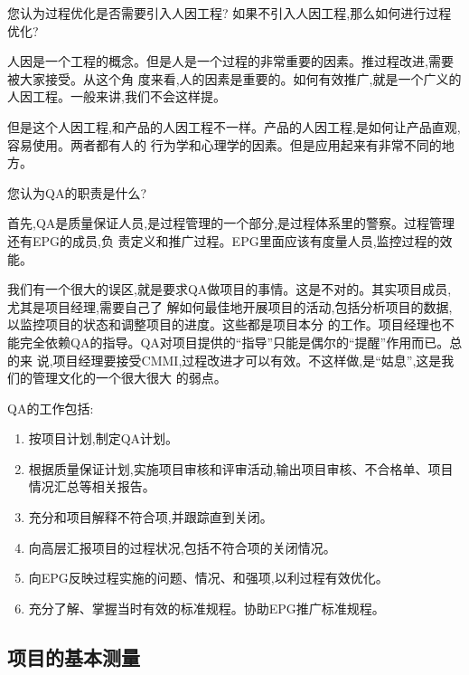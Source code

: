\documentclass[11pt]{article}
\begin{document}
\qlogo \begin{staff}
您认为过程优化是否需要引入人因工程? 如果不引入人因工程,那么如何进行过程优化?
\end{staff}

\begin{yang}
  \ylogo 人因是一个工程的概念。但是人是一个过程的非常重要的因素。推过程改进,需要被大家接受。从这个角
  度来看,人的因素是重要的。如何有效推广,就是一个广义的人因工程。一般来讲,我们不会这样提。

  但是这个人因工程,和产品的人因工程不一样。产品的人因工程,是如何让产品直观,容易使用。两者都有人的
  行为学和心理学的因素。但是应用起来有非常不同的地方。
\end{yang}

\qlogo\begin{staff}
您认为QA的职责是什么?
\end{staff}

\begin{yang}
  \ylogo 首先,QA是质量保证人员,是过程管理的一个部分,是过程体系里的警察。过程管理还有EPG的成员,负
  责定义和推广过程。EPG里面应该有度量人员,监控过程的效能。

  我们有一个很大的误区,就是要求QA做项目的事情。这是不对的。其实项目成员,尤其是项目经理,需要自己了
  解如何最佳地开展项目的活动,包括分析项目的数据,以监控项目的状态和调整项目的进度。这些都是项目本分
  的工作。项目经理也不能完全依赖QA的指导。QA对项目提供的``指导''只能是偶尔的``提醒''作用而已。总的来
  说,项目经理要接受CMMI,过程改进才可以有效。不这样做,是``姑息'',这是我们的管理文化的一个很大很大
  的弱点。

  QA的工作包括:
  \begin{enumerate}
    \item 按项目计划,制定QA计划。
    \item 根据质量保证计划,实施项目审核和评审活动,输出项目审核、不合格单、项目情况汇总等相关报告。
    \item 充分和项目解释不符合项,并跟踪直到关闭。
    \item 向高层汇报项目的过程状况,包括不符合项的关闭情况。
    \item 向EPG反映过程实施的问题、情况、和强项,以利过程有效优化。
    \item 充分了解、掌握当时有效的标准规程。协助EPG推广标准规程。
  \end{enumerate}
\end{yang}

\subsection{项目的基本测量}
\end{document}
